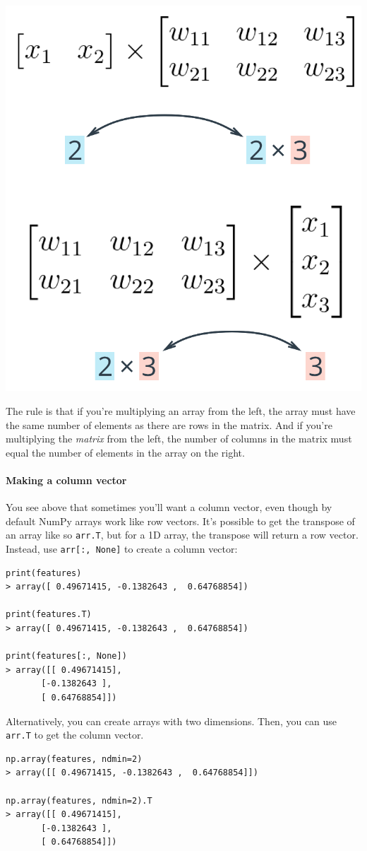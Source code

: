 \includegraphics[width=0.5\linewidth]{img//intro//matrix-mult-3.png}

The rule is that if you're multiplying an array from the left, the array must have the same number of elements as there are rows in the matrix. And if you're multiplying the \textit{matrix} from the left, the number of columns in the matrix must equal the number of elements in the array on the right.

\paragraph{Making a column vector}

You see above that sometimes you'll want a column vector, even though by default NumPy arrays work like row vectors. It's possible to get the transpose of an array like so \lstinline{arr.T}, but for a 1D array, the transpose will return a row vector. Instead, use \lstinline{arr[:, None]} to create a column vector:

\begin{lstlisting}
print(features)
> array([ 0.49671415, -0.1382643 ,  0.64768854])

print(features.T)
> array([ 0.49671415, -0.1382643 ,  0.64768854])

print(features[:, None])
> array([[ 0.49671415],
       [-0.1382643 ],
       [ 0.64768854]])
\end{lstlisting}

Alternatively, you can create arrays with two dimensions. Then, you can use \lstinline{arr.T} to get the column vector.

\begin{lstlisting}
np.array(features, ndmin=2)
> array([[ 0.49671415, -0.1382643 ,  0.64768854]])

np.array(features, ndmin=2).T
> array([[ 0.49671415],
       [-0.1382643 ],
       [ 0.64768854]])
\end{lstlisting}

